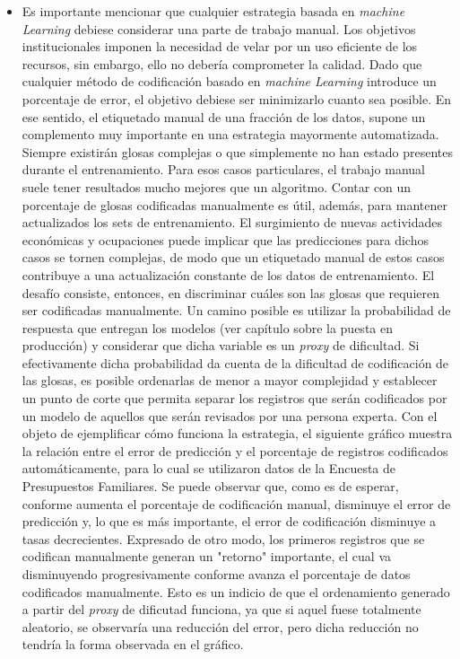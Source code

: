 \documentclass[
  12pt,
  spanish,
]{article}
\begin{document}
\begin{itemize}
  \item Es importante mencionar que cualquier estrategia basada en \textit{machine Learning} debiese considerar una parte de trabajo manual. Los objetivos institucionales imponen la necesidad de velar por un uso eficiente de los recursos, sin embargo, ello no debería comprometer la calidad. Dado que cualquier método de codificación basado en \textit{machine Learning} introduce un porcentaje de error, el objetivo debiese ser minimizarlo cuanto sea posible. En ese sentido, el etiquetado manual de una fracción de los datos, supone un complemento muy importante en una estrategia mayormente automatizada. Siempre existirán glosas complejas o que simplemente no han estado presentes durante el entrenamiento. Para esos casos particulares, el trabajo manual suele tener resultados mucho mejores que un algoritmo. Contar con un porcentaje de glosas codificadas manualmente es útil, además, para mantener actualizados los sets de entrenamiento. El surgimiento de nuevas actividades económicas y ocupaciones puede implicar que las predicciones para dichos casos se tornen complejas, de modo que un etiquetado manual de estos casos contribuye a una actualización constante de los datos de entrenamiento.  
\newline
\newline El desafío consiste, entonces, en discriminar cuáles son las glosas que requieren ser codificadas manualmente. Un camino posible es utilizar la probabilidad de respuesta que entregan los modelos (ver capítulo sobre la puesta en producción) y considerar que dicha variable es un \textit{proxy} de dificultad. Si efectivamente dicha probabilidad da cuenta de la dificultad de codificación de las glosas, es posible ordenarlas de menor a mayor complejidad y establecer un punto de corte que permita separar los registros que serán codificados por un modelo de aquellos que serán revisados por una persona experta.
\newline
\newline Con el objeto de ejemplificar cómo funciona la estrategia, el siguiente gráfico muestra la relación entre el error de predicción y el porcentaje de registros codificados automáticamente, para lo cual se utilizaron datos de la Encuesta de Presupuestos Familiares. Se puede observar que, como es de esperar, conforme aumenta el porcentaje de codificación manual, disminuye el error de predicción y, lo que es más importante, el error de codificación disminuye a tasas decrecientes. Expresado de otro modo, los primeros registros que se codifican manualmente generan un "retorno" importante, el cual va disminuyendo progresivamente conforme avanza el porcentaje de datos codificados manualmente. Esto es un indicio de que el ordenamiento generado a partir del \textit{proxy} de dificutad funciona, ya que si aquel fuese totalmente aleatorio, se observaría una reducción del error, pero dicha reducción no tendría la forma observada en el gráfico.

\end{itemize}
\end{document}
